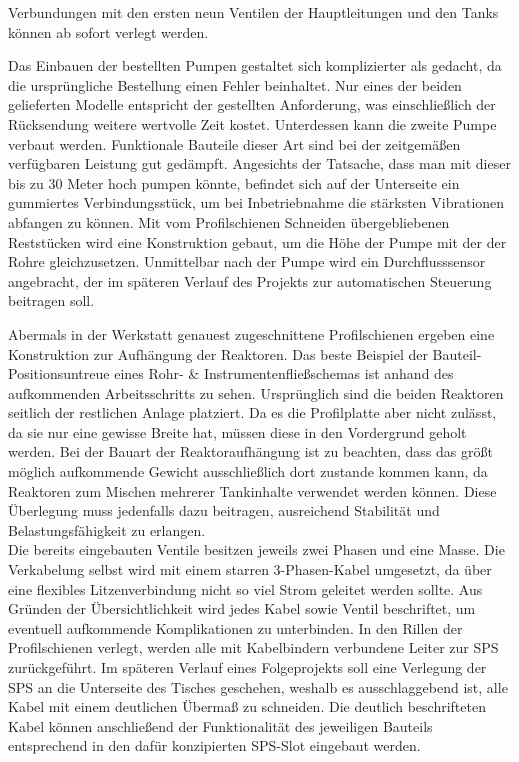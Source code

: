 	Verbundungen mit den ersten neun Ventilen der Hauptleitungen und den Tanks können ab sofort verlegt werden.\\
	
		
	Das Einbauen der bestellten Pumpen gestaltet sich komplizierter als gedacht, da die ursprüngliche Bestellung einen Fehler beinhaltet. Nur eines der beiden gelieferten Modelle entspricht der gestellten Anforderung, was einschließlich der Rücksendung weitere wertvolle Zeit kostet. Unterdessen kann die zweite Pumpe verbaut werden. Funktionale Bauteile dieser Art sind bei der zeitgemäßen verfügbaren Leistung gut gedämpft. Angesichts der Tatsache, dass man mit dieser bis zu 30 Meter hoch pumpen könnte, befindet sich auf der Unterseite ein gummiertes Verbindungsstück, um bei Inbetriebnahme die stärksten Vibrationen abfangen zu können. Mit vom Profilschienen Schneiden übergebliebenen Reststücken wird eine Konstruktion gebaut, um die Höhe der Pumpe mit der der Rohre gleichzusetzen. Unmittelbar nach der Pumpe wird ein Durchflusssensor angebracht, der im späteren Verlauf des Projekts zur automatischen Steuerung beitragen soll.
	
	Abermals in der Werkstatt genauest zugeschnittene Profilschienen ergeben eine Konstruktion zur Aufhängung der Reaktoren. Das beste Beispiel der Bauteil-Positionsuntreue eines Rohr- \& Instrumentenfließschemas ist anhand des aufkommenden Arbeitsschritts zu sehen. Ursprünglich sind die beiden Reaktoren seitlich der restlichen Anlage platziert. Da es die Profilplatte aber nicht zulässt, da sie nur eine gewisse Breite hat, müssen diese in den Vordergrund geholt werden. Bei der Bauart der Reaktoraufhängung ist zu beachten, dass das größt möglich aufkommende Gewicht ausschließlich dort zustande kommen kann, da Reaktoren zum Mischen mehrerer Tankinhalte verwendet werden können. Diese Überlegung muss jedenfalls dazu beitragen, ausreichend Stabilität und Belastungsfähigkeit zu erlangen.\\
	
	Die bereits eingebauten Ventile besitzen jeweils zwei Phasen und eine Masse. Die Verkabelung selbst wird mit einem starren 3-Phasen-Kabel umgesetzt, da über eine flexibles Litzenverbindung nicht so viel Strom geleitet   werden sollte. Aus Gründen der Übersichtlichkeit wird jedes Kabel sowie Ventil beschriftet, um eventuell aufkommende Komplikationen zu unterbinden. In den Rillen der Profilschienen verlegt, werden alle mit Kabelbindern verbundene Leiter zur SPS zurückgeführt. Im späteren Verlauf eines Folgeprojekts soll eine Verlegung der SPS an die Unterseite des Tisches geschehen, weshalb es ausschlaggebend ist, alle Kabel mit einem deutlichen Übermaß zu schneiden. Die deutlich beschrifteten Kabel können anschließend der Funktionalität des jeweiligen Bauteils entsprechend in den dafür konzipierten SPS-Slot eingebaut werden.\\
	
